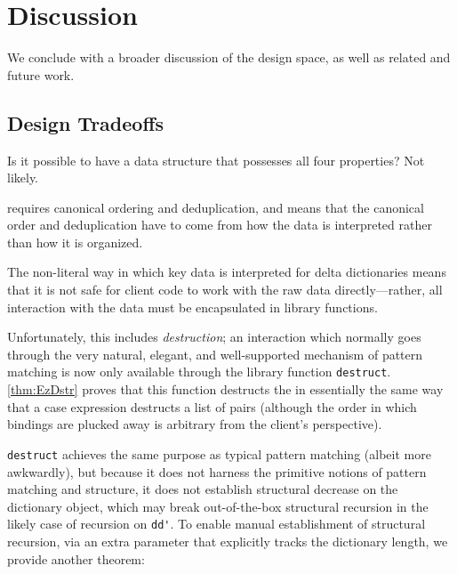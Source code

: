 \section{Discussion}
\label{sec:Discussion}

We conclude with a broader discussion of the design space, as well as related
and future work.

\subsection{Design Tradeoffs}
\label{sec:Tradeoffs}

Is it possible to have a data structure that possesses all four properties?
%
Not likely.

\SemInj{} requires canonical ordering and deduplication, and \SemTot{} means that the canonical order and deduplication have to come from how the data is interpreted rather than how it is organized.


%
The non-literal way in which key data is interpreted for delta dictionaries means that it is not safe for client code to work with the raw data directly---rather, all interaction with the data must be
encapsulated in library functions.

Unfortunately, this includes \emph{destruction}; an interaction which
normally goes through the very natural, elegant, and well-supported mechanism of pattern matching is now
only available through the library function \verb+destruct+. \autoref{thm:EzDstr} proves that this function
destructs the \dd{} in essentially the same way that a case expression destructs a list of pairs (although
the order in which bindings are plucked away is arbitrary from the client's perspective).

\verb+destruct+ achieves the same purpose as typical pattern matching (albeit more awkwardly), but because it
does not harness the primitive notions of pattern matching and structure, it does not establish structural
decrease on the dictionary object, which may break out-of-the-box structural recursion in the likely case
of recursion on \verb+dd'+. To enable manual establishment of structural recursion, via an extra parameter that
explicitly tracks the dictionary length, we provide another theorem:

